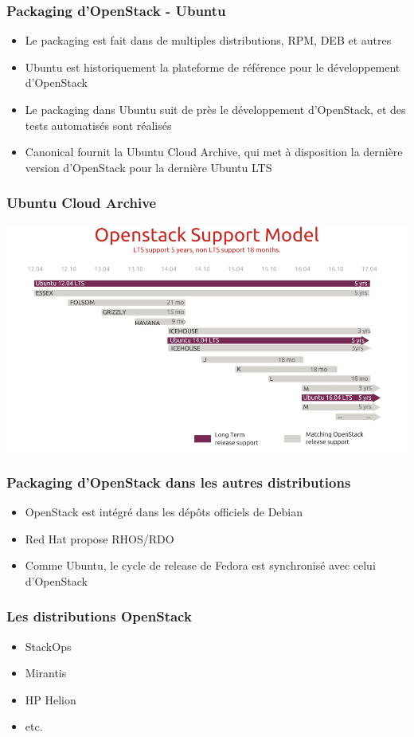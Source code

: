   \begin{frame}
    \frametitle{Packaging d'OpenStack - Ubuntu}
    \begin{itemize}
      \item Le packaging est fait dans de multiples distributions, RPM, DEB et autres\pause
      \item Ubuntu est historiquement la plateforme de référence pour le développement d'OpenStack
      \item Le packaging dans Ubuntu suit de près le développement d'OpenStack, et des tests automatisés sont réalisés
      \item Canonical fournit la Ubuntu Cloud Archive, qui met à disposition la dernière version d'OpenStack pour la dernière Ubuntu LTS
    \end{itemize}
  \end{frame}

  \begin{frame}
    \frametitle{Ubuntu Cloud Archive}
    \includegraphics[width=\textwidth]{images/ubuntu-cloud-archive.png}
  \end{frame}

  \begin{frame}
    \frametitle{Packaging d'OpenStack dans les autres distributions}
    \begin{itemize}
      \item OpenStack est intégré dans les dépôts officiels de Debian
      \item Red Hat propose RHOS/RDO
      \item Comme Ubuntu, le cycle de release de Fedora est synchronisé avec celui d'OpenStack
    \end{itemize}
  \end{frame}

  \begin{frame}
    \frametitle{Les distributions OpenStack}
    \begin{itemize}
      \item StackOps
      \item Mirantis
      \item HP Helion
      \item etc.
    \end{itemize}
  \end{frame}

